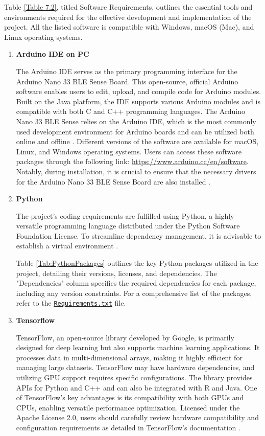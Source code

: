 Table \ref{Table 7.2}, titled Software Requirements, outlines the essential tools and environments required for the effective development and implementation of the project. All the listed software is compatible with Windows, macOS (Mac), and Linux operating systems.

\begin{enumerate}
	
	\item \textbf{Arduino IDE on PC}
	
	The Arduino IDE serves as the primary programming interface for the Arduino Nano 33 BLE Sense Board. This open-source, official Arduino software enables users to edit, upload, and compile code for Arduino modules. Built on the Java platform, the IDE supports various Arduino modules and is compatible with both C and C++ programming languages. The Arduino Nano 33 BLE Sense relies on the Arduino IDE, which is the most commonly used development environment for Arduino boards and can be utilized both online and offline \cite{Arduino:2015}. Different versions of the software are available for macOS, Linux, and Windows operating systems. Users can access these software packages through the following link: \url{https://www.arduino.cc/en/software}. Notably, during installation, it is crucial to ensure that the necessary drivers for the Arduino Nano 33 BLE Sense Board are also installed \cite{Fezari:2018}.
	
	
	\item \textbf{Python}
	
	The project's coding requirements are fulfilled using Python, a highly versatile programming language distributed under the Python Software Foundation License. To streamline dependency management, it is advisable to establish a virtual environment \cite{PyCharm:2021}.  
	
	Table \ref{Tab:PythonPackages} outlines the key Python packages utilized in the project, detailing their versions, licenses, and dependencies. The "Dependencies" column specifies the required dependencies for each package, including any version constraints. For a comprehensive list of the packages, refer to the \href{../Documents/MagicWand/ML23-06-Magic-Wand-with-an-Arduino-Nano-33-BLE-sense/Sourcecode/Requirements.txt}{\texttt{Requirements.txt}} file.
	
	\item \textbf{Tensorflow}
	
	TensorFlow, an open-source library developed by Google, is primarily designed for deep learning but also supports machine learning applications. It processes data in multi-dimensional arrays, making it highly efficient for managing large datasets. TensorFlow may have hardware dependencies, and utilizing GPU support requires specific configurations. The library provides APIs for Python and C++ and can also be integrated with R and Java. One of TensorFlow's key advantages is its compatibility with both GPUs and CPUs, enabling versatile performance optimization. Licensed under the Apache License 2.0, users should carefully review hardware compatibility and configuration requirements as detailed in TensorFlow's documentation \cite{Ramsundar:2018}.
	

\end{enumerate}
